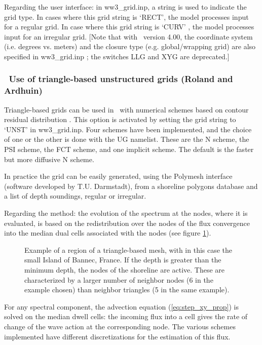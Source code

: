 Regarding the user interface: in {\file ww3\_grid.inp}, a string is used to indicate the grid type. In cases where this grid 
string is `{\F RECT}', the model processes input for a regular grid. In case where this grid string is `{\F CURV}' , the model 
processes input for an irregular grid. [Note that with \ws\ version 4.00, the coordinate system (i.e. degrees vs. meters) and 
the closure type (e.g. global/wrapping grid) are also specified in  {\file ww3\_grid.inp} ; the switches LLG and XYG are deprecated.] 

\vsssub
\subsubsection{~Use of triangle-based unstructured grids \hfill {\rm (Roland and Ardhuin)}} \label{sec_prug}
\vsssub
Triangle-based grids can be used in \ws\ with numerical schemes based on contour residual distribution \citep[][for a review]{PhD:Rol}. 
This option is activated by setting the  grid string to `{\F UNST}' in {\file ww3\_grid.inp}.
Four schemes have been implemented, and the choice of one or the other is done with the UG namelist. 
These are the N scheme, the PSI scheme, the FCT scheme, and one implicit scheme. The default is the faster but more diffusive N scheme. 

In practice the grid can be easily generated, using the Polymesh interface (software developed by T.U. Darmstadt), 
from a shoreline polygons database \citep[e.g.][]{art:WS96} and a list of depth soundings, regular
or irregular. 

Regarding the method: the evolution of the spectrum at the nodes, where it is evaluated, is based on the redistribution over the nodes of
the flux convergence into the median dual cells associated with the nodes (see figure \ref{fig:triangles}).
\begin{figure} \begin{center}
\caption{Example of a region of a triangle-based mesh, with in this case the small Island of Bannec, France. If the depth is greater than 
the minimum depth, the nodes of the shoreline are active. These are characterized by a larger number of neighbor nodes (6 in the example chosen) 
than neighbor triangles (5 in the same example). 
}
\label{fig:triangles} \botline
\end{center}
\end{figure}
 For any  spectral component, the advection equation (\ref{eq:step_xy_prop}) is solved on the median dwell cells: the incoming flux into a
cell gives the rate of change of the wave action at the corresponding node. The various schemes implemented have 
different discretizations for the estimation of this flux. 

